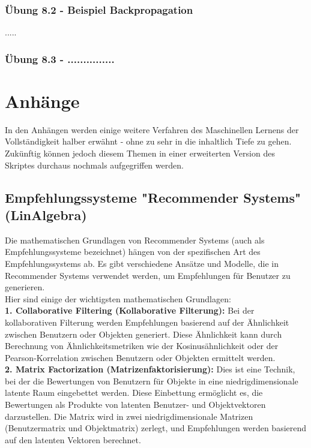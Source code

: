 \documentclass[12pt]{article}
\begin{document}
\subsubsection{Übung 8.2 - Beispiel Backpropagation}
.....\\
\subsubsection{Übung 8.3 - ...............}

\newpage


\section{Anhänge\\}

In den Anhängen werden einige weitere Verfahren des Maschinellen Lernens der Vollständigkeit halber erwähnt - ohne zu sehr in die inhaltlich Tiefe zu gehen. Zukünftig können jedoch diesem Themen in einer erweiterten Version des Skriptes durchaus nochmals aufgegriffen werden.  \\[0.2cm]


\subsection{Empfehlungssysteme "Recommender Systems" (LinAlgebra)}
Die mathematischen Grundlagen von Recommender Systems (auch als Empfehlungssysteme bezeichnet) hängen von der spezifischen Art des Empfehlungssystems ab. Es gibt verschiedene Ansätze und Modelle, die in Recommender Systems verwendet werden, um Empfehlungen für Benutzer zu generieren.\\
Hier sind einige der wichtigsten mathematischen Grundlagen:\\

\textbf{1. Collaborative Filtering (Kollaborative Filterung):} Bei der kollaborativen Filterung werden Empfehlungen basierend auf der Ähnlichkeit zwischen Benutzern oder Objekten generiert. Diese Ähnlichkeit kann durch Berechnung von Ähnlichkeitsmetriken wie der Kosinusähnlichkeit oder der Pearson-Korrelation zwischen Benutzern oder Objekten ermittelt werden.\\

\textbf{2. Matrix Factorization (Matrizenfaktorisierung):} Dies ist eine Technik, bei der die Bewertungen von Benutzern für Objekte in eine niedrigdimensionale latente Raum eingebettet werden. Diese Einbettung ermöglicht es, die Bewertungen als Produkte von latenten Benutzer- und Objektvektoren darzustellen. Die Matrix wird in zwei niedrigdimensionale Matrizen (Benutzermatrix und Objektmatrix) zerlegt, und Empfehlungen werden basierend auf den latenten Vektoren berechnet.\\
\end{document}
